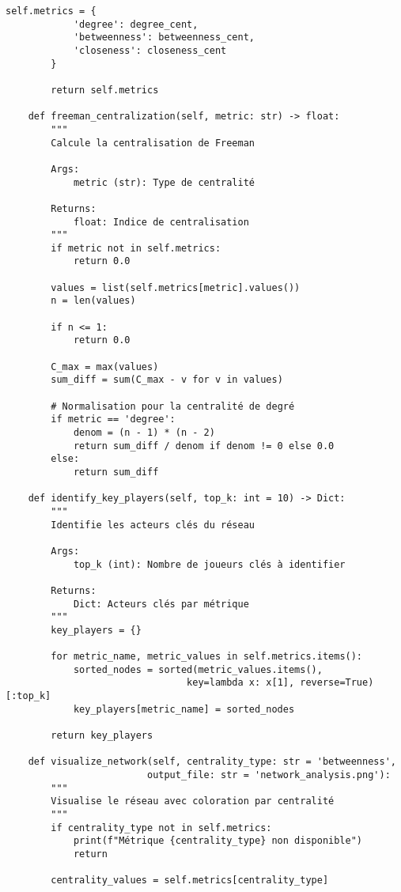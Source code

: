 \documentclass[12pt,a4paper]{article}
\begin{document}
\begin{lstlisting}[caption=Analyse de réseau criminel avec NetworkX]
        self.metrics = {
            'degree': degree_cent,
            'betweenness': betweenness_cent,
            'closeness': closeness_cent
        }
        
        return self.metrics
    
    def freeman_centralization(self, metric: str) -> float:
        """
        Calcule la centralisation de Freeman
        
        Args:
            metric (str): Type de centralité
            
        Returns:
            float: Indice de centralisation
        """
        if metric not in self.metrics:
            return 0.0
            
        values = list(self.metrics[metric].values())
        n = len(values)
        
        if n <= 1:
            return 0.0
            
        C_max = max(values)
        sum_diff = sum(C_max - v for v in values)
        
        # Normalisation pour la centralité de degré
        if metric == 'degree':
            denom = (n - 1) * (n - 2)
            return sum_diff / denom if denom != 0 else 0.0
        else:
            return sum_diff
    
    def identify_key_players(self, top_k: int = 10) -> Dict:
        """
        Identifie les acteurs clés du réseau
        
        Args:
            top_k (int): Nombre de joueurs clés à identifier
            
        Returns:
            Dict: Acteurs clés par métrique
        """
        key_players = {}
        
        for metric_name, metric_values in self.metrics.items():
            sorted_nodes = sorted(metric_values.items(), 
                                key=lambda x: x[1], reverse=True)[:top_k]
            key_players[metric_name] = sorted_nodes
        
        return key_players
    
    def visualize_network(self, centrality_type: str = 'betweenness', 
                         output_file: str = 'network_analysis.png'):
        """
        Visualise le réseau avec coloration par centralité
        """
        if centrality_type not in self.metrics:
            print(f"Métrique {centrality_type} non disponible")
            return
        
        centrality_values = self.metrics[centrality_type]
        

\end{lstlisting}
\end{document}
